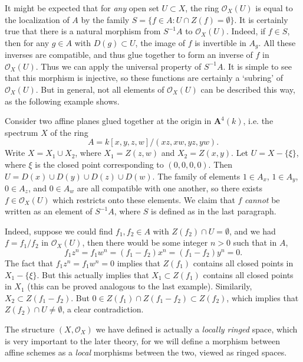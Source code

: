 It might be expected that for \emph{any} open set $U \subset X$, the ring $\mathcal{O}_X(U)$ is equal to the localization of $A$ by the family $S = \{ f \in A: U \cap Z(f) = \emptyset \}$. It is certainly true that there is a natural morphism from $S^{-1}A$ to $\mathcal{O}_X(U)$. Indeed, if $f \in S$, then for any $g \in A$ with $D(g) \subset U$, the image of $f$ is invertible in $A_g$. All these inverses are compatible, and thus glue together to form an inverse of $f$ in $\mathcal{O}_X(U)$. Thus we can apply the universal property of $S^{-1}A$. It is simple to see that this morphism is injective, so these functions are certainly a `subring' of $\mathcal{O}_X(U)$. But in general, not all elements of $\mathcal{O}_X(U)$ can be described this way, as the following example shows.

\begin{example}
    Consider two affine planes glued together at the origin in $\mathbf{A}^4(k)$, i.e. the spectrum $X$ of the ring
    \[ A = k[x,y,z,w]/(xz,xw,yz,yw). \]
    Write $X = X_1 \cup X_2$, where $X_1 = Z(z,w)$ and $X_2 = Z(x,y)$. Let $U = X - \{ \xi \}$, where $\xi$ is the closed point corresponding to $(0,0,0,0)$. Then $U = D(x) \cup D(y) \cup D(z) \cup D(w)$. The family of elements $1 \in A_x$, $1 \in A_y$, $0 \in A_z$, and $0 \in A_w$ are all compatible with one another, so there exists $f \in \mathcal{O}_X(U)$ which restricts onto these elements. We claim that $f$ \emph{cannot} be written as an element of $S^{-1}A$, where $S$ is defined as in the last paragraph.

    Indeed, suppose we could find $f_1,f_2 \in A$ with $Z(f_2) \cap U = \emptyset$, and we had $f = f_1/f_2$ in $\mathcal{O}_X(U)$, then there would be some integer $n > 0$ such that in $A$,
    \[ f_1z^n = f_1w^n = (f_1 - f_2)x^n = (f_1 - f_2)y^n = 0. \]
    The fact that $f_1z^n = f_1w^n = 0$ implies that $Z(f_1)$ contains all closed points in $X_1 - \{ \xi \}$. But this actually implies that $X_1 \subset Z(f_1)$ contains all closed points in $X_1$ (this can be proved analogous to the last example). Similarily, $X_2 \subset Z(f_1 - f_2)$. But $0 \in Z(f_1) \cap Z(f_1 - f_2) \subset Z(f_2)$, which implies that $Z(f_2) \cap U \neq \emptyset$, a clear contradiction.
\end{example}

The structure $(X,\mathcal{O}_X)$ we have defined is actually a \emph{locally ringed} space, which is very important to the later theory, for we will define a morphism between affine schemes as a \emph{local} morphisms between the two, viewed as ringed spaces.

